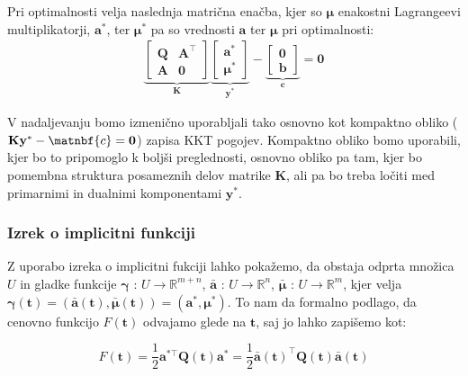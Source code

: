 \documentclass[mat2, tisk]{fmfdelo}
\newcommand{\R}{\mathbb R}
\newcommand{\aimplicit}{\bar{\mathbf{a}}}
\newcommand{\muimplicit}{\bar{\mathbf{\mu}}}
\newcommand{\yimplicit}{\mathbf{\gamma}}
\newcommand{\qmat}{\mathbf{Q}}
\newcommand{\amat}{\mathbf{A}}
\newcommand{\kmat}{\mathbf{K}}
\newcommand{\bvec}{\mathbf{b}}
\newcommand{\avec}{\mathbf{a}}
\newcommand{\tvec}{\mathbf{t}}
\newcommand{\muvec}{\boldsymbol{\mu}}
\begin{document}
Pri optimalnosti velja naslednja matrična enačba, kjer so $\mathbf{\mu}$ enakostni Lagrangeevi multiplikatorji, $\mathbf{a^*}$, ter $\mathbf{\mu^*}$ pa so vrednosti $\mathbf{a}$ ter $\mathbf{\mu}$ pri optimalnosti:
\begin{equation}
    \begin{gathered}
        \underbrace{
            \begin{bmatrix}
                \qmat & \amat^{\top} \\
                \amat & \mathbf{0}
            \end{bmatrix}
        }_{\kmat}
        \underbrace{
            \begin{bmatrix}
                \avec^* \\
                \boldsymbol{\mu}^*
            \end{bmatrix}
        }_{\mathbf{y}^*}
        -
        \underbrace{
            \begin{bmatrix}
                \mathbf{0} \\
                \bvec
            \end{bmatrix}
        }_{\mathbf{c}}
        = \mathbf{0}
    \end{gathered}
\end{equation}


V nadaljevanju bomo izmenično uporabljali tako osnovno kot kompaktno obliko ($\kmat \mathbf{y}^* - \matnbf{c} = \mathbf{0}$) zapisa KKT pogojev. Kompaktno obliko bomo uporabili, kjer bo to pripomoglo k boljši preglednosti, osnovno obliko pa tam, kjer bo pomembna struktura posameznih delov matrike $\kmat$, ali pa bo treba ločiti med primarnimi in dualnimi komponentami $\mathbf{y}^*$.

\subsubsection{Izrek o implicitni funkciji}
\label{sec:ift}

Z uporabo izreka o implicitni fukciji lahko pokažemo, da obstaja odprta množica $U$ in gladke funkcije $\yimplicit$ : $U \to \R^{m+n}$, $\aimplicit$ : $U \to \R^{n}$, $\muimplicit$ : $U \to \R^{m}$, kjer velja $\yimplicit(\tvec) = (\aimplicit(\tvec), \muimplicit(\tvec)) = (\avec^*, \muvec^*)$. To nam da formalno podlago, da cenovno funkcijo $F(\tvec)$ odvajamo glede na $\tvec$, saj jo lahko zapišemo kot:

\begin{equation}
    F(\mathbf{t}) = \frac{1}{2}\avec^{*\top}\qmat(\tvec)\avec^* = \frac{1}{2} \aimplicit(\tvec)^\top \qmat(\tvec) \aimplicit(\tvec)
\end{equation}
\end{document}
